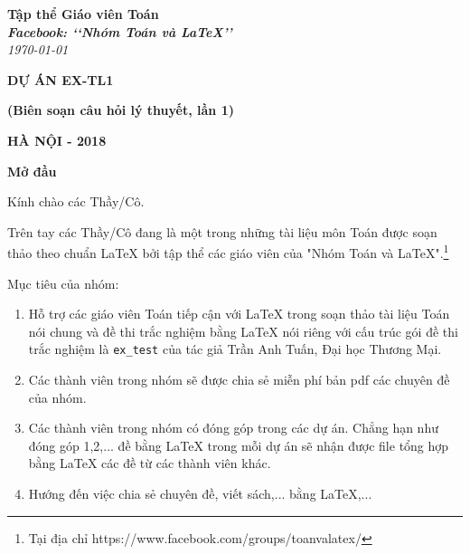 \documentclass[12pt,a4paper,oneside]{article}
\begin{document}
	\begin{titlepage}
		\begin{flushright}
			\fontsize{17}{0}\selectfont
			\textbf{Tập thể Giáo viên Toán}\\
			\textbf{\textit{Facebook: \lq\lq Nhóm Toán và LaTeX\rq\rq}}\\
			\textit{\color{red}\today}
		\end{flushright}
		
		\vspace{4cm}
		
		\begin{flushright}
		\textbf{\fontsize{50}{0}\selectfont DỰ ÁN EX-TL1}
		
		\vspace{1cm}
		
      	\textbf{\fontsize{20}{0}\selectfont (Biên soạn câu hỏi lý thuyết, lần 1)}		
		\end{flushright}
		
		\vfill{
			\begin{flushright}
				\fontsize{17}{0}\textbf{HÀ NỘI - 2018}
			\end{flushright}
		}
	\end{titlepage}
	
	
	\pagestyle{fancy}
	\rfoot{\thepage}
	\cfoot{\empty}	
	\lfoot{\currfilename}
	\lhead{\currfilename}

\vspace*{1cm}
	
{\bf\LARGE Mở đầu}

\vspace*{1cm}
	
	Kính chào các Thầy/Cô.
	
	\vspace{0.6cm}
	
	\noindent Trên tay các Thầy/Cô đang là một trong những tài liệu môn Toán được soạn thảo theo chuẩn \LaTeX{} bởi tập thể các giáo viên của "Nhóm Toán và LaTeX".\footnote{Tại địa chỉ https://www.facebook.com/groups/toanvalatex/}
	
	\vspace{0.6cm}
	
	\noindent Mục tiêu của nhóm: 
	\begin{enumerate}[\bf 1.]
		\item Hỗ trợ các giáo viên Toán tiếp cận với \LaTeX{} trong soạn thảo tài liệu Toán nói chung và đề thi trắc nghiệm bằng \LaTeX{} nói riêng với cấu trúc gói đề thi trắc nghiệm là \texttt{ex\_test} của tác giả Trần Anh Tuấn, Đại học Thương Mại.
		\item Các thành viên trong nhóm sẽ được chia sẻ miễn phí bản pdf  các chuyên đề của nhóm.
		\item Các thành viên trong nhóm có đóng góp trong các dự án. Chẳng hạn như đóng góp 1,2,... đề bằng \LaTeX{} trong mỗi dự án sẽ nhận được file tổng hợp bằng \LaTeX{} các đề từ các thành viên khác.
		\item Hướng đến việc chia sẻ chuyên đề, viết sách,... bằng \LaTeX,...
    \end{enumerate}	
\end{document}
